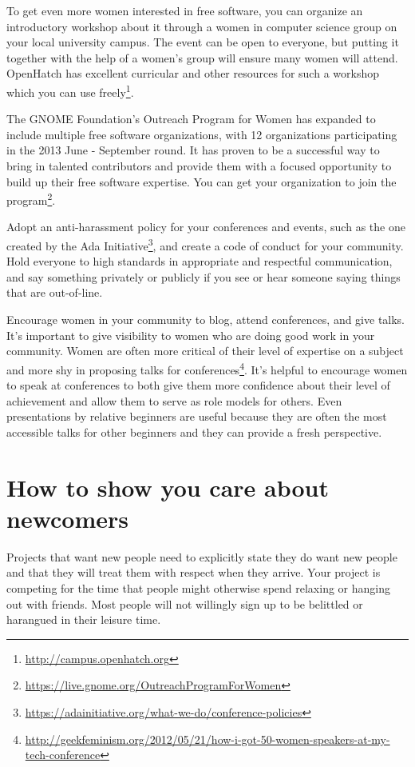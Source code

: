 To get even more women interested in free software, you can organize an introductory workshop about it through a women in computer science group on your local university campus. The event can be open to everyone, but putting it together with the help of a women’s group will ensure many women will attend. OpenHatch has excellent curricular and other resources for such a workshop which you can use freely\footnote{\url{http://campus.openhatch.org}}.

The GNOME Foundation’s Outreach Program for Women has expanded to include multiple free software organizations, with 12 organizations participating in the 2013 June - September round. It has proven to be a successful way to bring in talented contributors and provide them with a focused opportunity to build up their free software expertise. You can get your organization to join the program\footnote{\url{https://live.gnome.org/OutreachProgramForWomen}}.

Adopt an anti-harassment policy for your conferences and events, such as the one created by the Ada Initiative\footnote{\url{https://adainitiative.org/what-we-do/conference-policies}}, and create a code of conduct for your community. Hold everyone to high standards in appropriate and respectful communication, and say something privately or publicly if you see or hear someone saying things that are out-of-line.

Encourage women in your community to blog, attend conferences, and give talks. It’s important to give visibility to women who are doing good work in your community. Women are often more critical of their level of expertise on a subject and more shy in proposing talks for conferences\footnote{\url{http://geekfeminism.org/2012/05/21/how-i-got-50-women-speakers-at-my-tech-conference}}. It’s helpful to encourage women to speak at conferences to both give them more confidence about their level of achievement and allow them to serve as role models for others. Even presentations by relative beginners are useful because they are often the most accessible talks for other beginners and they can provide a fresh perspective.

\section{How to show you care about newcomers}
Projects that want new people need to explicitly state they do want new people and that they will treat them with respect when they arrive. Your project is competing for the time that people might otherwise spend relaxing or hanging out with friends. Most people will not willingly sign up to be belittled or harangued in their leisure time.  

